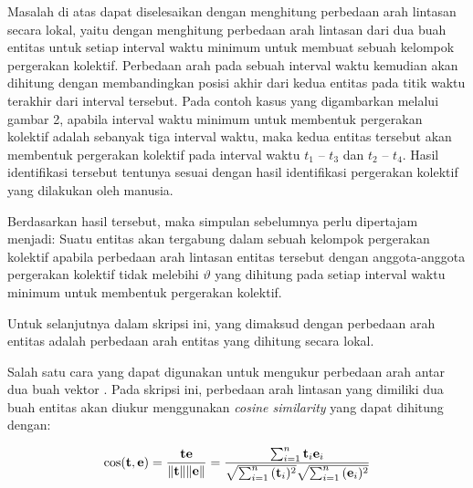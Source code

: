 Masalah di atas dapat diselesaikan dengan menghitung perbedaan arah lintasan secara lokal, yaitu dengan menghitung perbedaan arah lintasan dari dua buah entitas untuk setiap interval waktu minimum untuk membuat sebuah kelompok pergerakan kolektif. Perbedaan arah pada sebuah interval waktu kemudian akan dihitung dengan membandingkan posisi akhir dari kedua entitas pada titik waktu terakhir dari interval tersebut. Pada contoh kasus yang digambarkan melalui gambar 2, apabila interval waktu minimum untuk membentuk pergerakan kolektif adalah sebanyak tiga interval waktu, maka kedua entitas tersebut akan membentuk pergerakan kolektif pada interval waktu $t_1$ -- $t_3$ dan $t_2$ -- $t_4$. Hasil identifikasi tersebut tentunya sesuai dengan hasil identifikasi pergerakan kolektif yang dilakukan oleh manusia. 

Berdasarkan hasil tersebut, maka simpulan sebelumnya perlu dipertajam menjadi: Suatu entitas akan tergabung dalam sebuah kelompok pergerakan kolektif apabila perbedaan arah lintasan entitas tersebut dengan anggota-anggota pergerakan kolektif tidak melebihi $\vartheta$ yang dihitung pada setiap interval waktu minimum untuk membentuk pergerakan kolektif. 

Untuk selanjutnya dalam skripsi ini, yang dimaksud dengan perbedaan arah entitas adalah perbedaan arah entitas yang dihitung secara lokal.


Salah satu cara yang dapat digunakan untuk mengukur perbedaan arah antar dua buah vektor \iffalse \lionov{kalo elu tau beberapa, mending dibilang, tapi kalo gak tau, bilang aja "salah satu cara", takut ditanya sama penguji :D} \cristopher{done} \fi. Pada skripsi ini, perbedaan arah lintasan yang dimiliki dua buah entitas akan diukur menggunakan \textit{cosine similarity} yang dapat dihitung dengan:

\begin{equation}
    \cos ({\bf t},{\bf e})= {{\bf t} {\bf e} \over \|{\bf t}\| \|{\bf e}\|} = \frac{ \sum_{i=1}^{n}{{\bf t}_i{\bf e}_i} }{ \sqrt{\sum_{i=1}^{n}{({\bf t}_i)^2}} \sqrt{\sum_{i=1}^{n}{({\bf e}_i)^2}} }
\end{equation}

